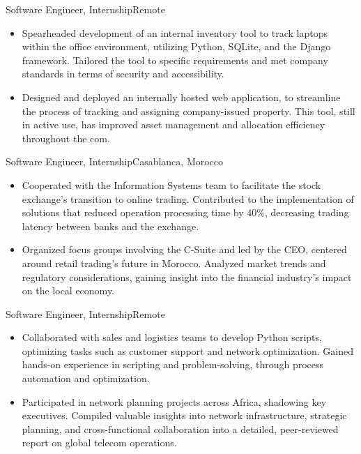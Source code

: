 \documentclass[letterpaper,10.5pt]{article}
\begin{document}
{Software Engineer, Internship}{Remote}
\begin{itemize}
    \item Spearheaded development of an internal inventory tool to track laptops within the office environment, utilizing Python, SQLite, and the Django framework. Tailored the tool to specific requirements and met company standards in terms of security and accessibility.
    
    \item Designed and deployed an internally hosted web application, to streamline the process of tracking and assigning company-issued property. This tool, still in active use, has improved asset management and allocation efficiency throughout the com.
\end{itemize}

{Software Engineer, Internship}{Casablanca, Morocco}
\begin{itemize}
    \item Cooperated with the Information Systems team to facilitate the stock exchange’s transition to online trading. Contributed to the implementation of solutions that reduced operation processing time by 40\%, decreasing trading latency between banks and the exchange.
    
    \item Organized focus groups involving the C-Suite and led by the CEO, centered around retail trading's future in Morocco. Analyzed market trends and regulatory considerations, gaining insight into the financial industry's impact on the local economy.
\end{itemize}
{Software Engineer, Internship}{Remote}
\begin{itemize}
    \item Collaborated with sales and logistics teams to develop Python scripts, optimizing tasks such as customer support and network optimization. Gained hands-on experience in scripting and problem-solving, through process automation and optimization.
    
    \item Participated in network planning projects across Africa, shadowing key executives. Compiled valuable insights into network infrastructure, strategic planning, and cross-functional collaboration into a detailed, peer-reviewed report on global telecom operations.

\end{itemize}
\end{document}
